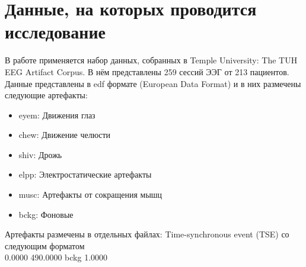 \documentclass[12pt, a4paper, titlepage]{extreport}
\begin{document}
	\section*{Данные, на которых проводится исследование}
	В работе применяется набор данных, собранных в Temple University: The TUH EEG Artifact Corpus. В нём представлены 259 сессий ЭЭГ от 213 пациентов. Данные представлены в edf формате (European Data Format) и в них размечены следующие артефакты:
	\begin{itemize}
		\item eyem: Движения глаз
		\item chew: Движение челюсти
		\item shiv: Дрожь
		\item elpp: Электростатические артефакты
		\item musc: Артефакты от сокращения мышц
		\item bckg: Фоновые
	\end{itemize}
	Артефакты размечены в отдельных файлах: Time-synchronous event (TSE) со следующим форматом\\
	
	0.0000 490.0000 bckg 1.0000\\
	
\end{document}
